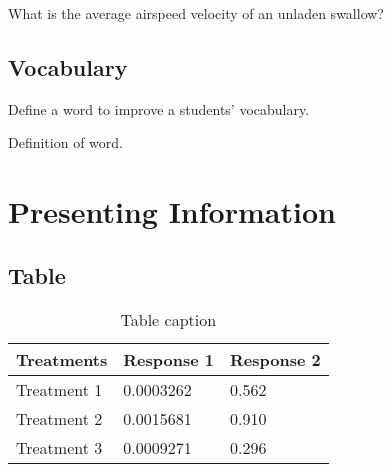 \documentclass[11pt,fleqn]{book} %
\begin{document}
\begin{problem}
What is the average airspeed velocity of an unladen swallow?
\end{problem}


\section{Vocabulary}

Define a word to improve a students' vocabulary.

\begin{vocabulary}[Word]
Definition of word.
\end{vocabulary}










\chapter{Presenting Information}

\section{Table}

\begin{table}[h]
\centering
\begin{tabular}{l l l}
\toprule
\textbf{Treatments} & \textbf{Response 1} & \textbf{Response 2}\\
\midrule
Treatment 1 & 0.0003262 & 0.562 \\
Treatment 2 & 0.0015681 & 0.910 \\
Treatment 3 & 0.0009271 & 0.296 \\
\bottomrule
\end{tabular}
\caption{Table caption}
\end{table}
\end{document}
